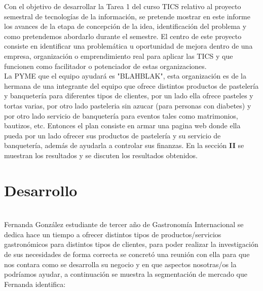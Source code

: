 \documentclass[preprintnumbers,superscriptaddress,amsmath,%
  amssymb,aps,reprint,nofootinbib]{revtex4-1}
\numberwithin{equation}{section}
\begin{document}




 



\noindent 
Con el objetivo de desarrollar la Tarea 1 del curso TICS relativo al proyecto semestral de tecnologías de la información, se pretende mostrar en este informe los avances de la etapa de concepción de la idea, identificación del problema y como pretendemos abordarlo durante el semestre. El centro de este proyecto consiste en identificar una problemática u oportunidad de mejora dentro de una empresa, organización o emprendimiento real para aplicar las TICS y  que funcionen como facilitador o potenciador de estas organizaciones.\\
La PYME que el equipo ayudará es "BLAHBLAK", esta organización es de la hermana de una integrante del equipo que ofrece distintos productos de pastelería y banquetería para diferentes tipos de clientes, por un lado ella ofrece pasteles y tortas varias, por otro lado pasteleria sin azucar (para personas con diabetes) y por otro lado servicio de banquetería para eventos tales como matrimonios, bautizos, etc. Entonces el plan consiste en armar una pagina web donde ella pueda por un lado ofrecer sus productos de pastelería y su servicio de banquetería, además de ayudarla a controlar sus finanzas.
\medskip
En la sección \textbf{II} se muestran los resultados y se discuten los resultados obtenidos.




\section{Desarrollo}

\\
 
 Fernanda González estudiante de tercer año de Gastronomía Internacional se dedica hace un tiempo a ofrecer distintos tipos de productos/servicios gastronómicos para distintos tipos de clientes, para poder realizar la investigación de sus necesidades de forma correcta se concretó una reunión con ella para que nos contara como se desarrolla su negocio y en que aspectos nosotras/os la podríamos ayudar, a continuación se muestra la segmentación de mercado que Fernanda identifica:
 
\end{document}
